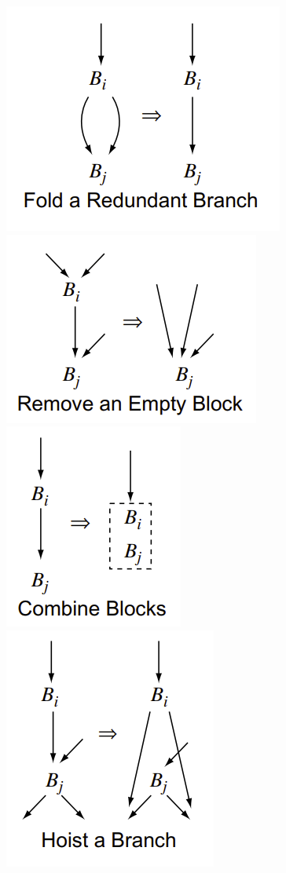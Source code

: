 \documentclass[11pt, a4paper, titlepage]{article}
\begin{document}
\begin{figure}[H]
  \centering
  \includegraphics[scale=0.3]{images/r5.png}
  \includegraphics[scale=0.3]{images/r6.png}
  \includegraphics[scale=0.3]{images/r7.png}
  \includegraphics[scale=0.3]{images/r8.png}
\end{figure}
\end{document}
